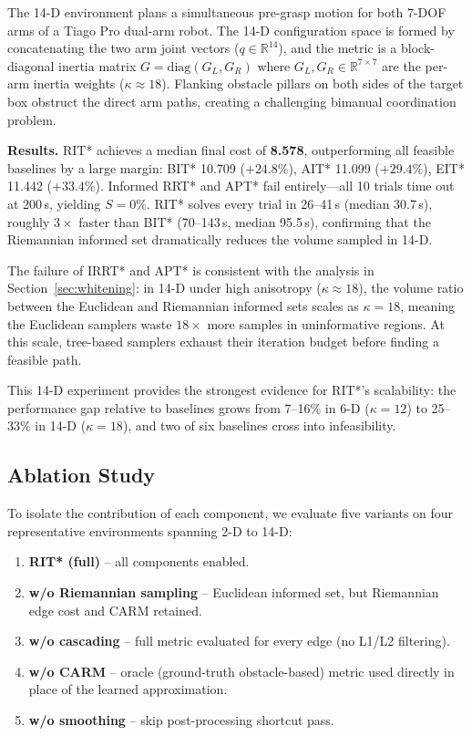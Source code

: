 \documentclass[journal]{IEEEtran}
\begin{document}
The 14-D environment plans a simultaneous pre-grasp motion for both
7-DOF arms of a Tiago Pro dual-arm robot.
The 14-D configuration space is formed by concatenating the two arm
joint vectors ($q \in \mathbb{R}^{14}$), and the metric is a
block-diagonal inertia matrix $G = \mathrm{diag}(G_L, G_R)$ where
$G_L, G_R \in \mathbb{R}^{7\times7}$ are the per-arm inertia weights
($\kappa \approx 18$).
Flanking obstacle pillars on both sides of the target box obstruct
the direct arm paths, creating a challenging bimanual coordination
problem.

\textbf{Results.}
RIT* achieves a median final cost of \textbf{8.578}, outperforming all
feasible baselines by a large margin: BIT* 10.709 ($+24.8\%$),
AIT* 11.099 ($+29.4\%$), EIT* 11.442 ($+33.4\%$).
Informed RRT* and APT* fail entirely---all 10 trials time out at
200\,s, yielding $S=0\%$.
RIT* solves every trial in 26--41\,s (median 30.7\,s), roughly
$3\times$ faster than BIT* (70--143\,s, median 95.5\,s),
confirming that the Riemannian informed set dramatically reduces
the volume sampled in 14-D.

The failure of IRRT* and APT* is consistent with the analysis in
Section~\ref{sec:whitening}: in 14-D under high anisotropy
($\kappa\approx18$), the volume ratio between the Euclidean and
Riemannian informed sets scales as $\kappa = 18$, meaning the
Euclidean samplers waste $18\times$ more samples in uninformative
regions. At this scale, tree-based samplers exhaust their iteration
budget before finding a feasible path.

This 14-D experiment provides the strongest evidence for
RIT*'s scalability: the performance gap relative to baselines
grows from 7--16\% in 6-D ($\kappa=12$) to 25--33\% in 14-D
($\kappa=18$), and two of six baselines cross into infeasibility.


\subsection{Ablation Study}\label{sec:ablation}

To isolate the contribution of each component, we evaluate five
variants on four representative environments spanning 2-D to 14-D:
\begin{enumerate}
  \item \textbf{RIT* (full)} -- all components enabled.
  \item \textbf{w/o Riemannian sampling} -- Euclidean informed set,
    but Riemannian edge cost and CARM retained.
  \item \textbf{w/o cascading} -- full metric evaluated for every
    edge (no L1/L2 filtering).
  \item \textbf{w/o CARM} -- oracle (ground-truth obstacle-based)
    metric used directly in place of the learned approximation.
  \item \textbf{w/o smoothing} -- skip post-processing shortcut pass.
\end{enumerate}
\end{document}
